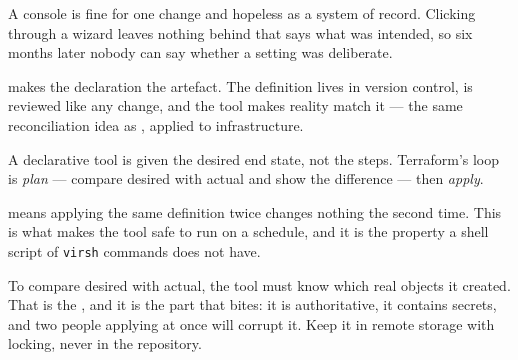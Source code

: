 A console is fine for one change and hopeless as a system of record. Clicking
through a wizard leaves nothing behind that says what was intended, so six
months later nobody can say whether a setting was deliberate.

 makes the declaration the artefact. The
definition lives in version control, is reviewed like any change, and the tool
makes reality match it --- the same reconciliation idea as ,
applied to infrastructure.

\begin{definitionbox}
A declarative tool is given the desired end state, not the steps. Terraform's
loop is \emph{plan} --- compare desired with actual and show the difference ---
then \emph{apply}.

\smallskip
{} means applying the same definition twice changes nothing the
second time. This is what makes the tool safe to run on a schedule, and it is
the property a shell script of \texttt{virsh} commands does not have.

\smallskip
To compare desired with actual, the tool must know which real objects it
created. That is the , and it is the part that bites: it is
authoritative, it contains secrets, and two people applying at once will
corrupt it. Keep it in remote storage with locking, never in the repository.
\end{definitionbox}

